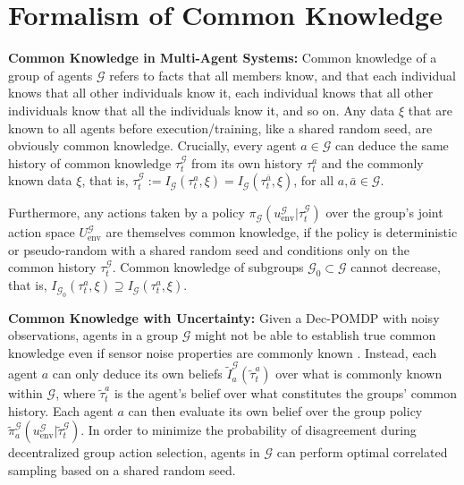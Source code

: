 \section{Formalism of Common Knowledge}
\label{sec:mackrl_details}
\textbf{Common Knowledge in Multi-Agent Systems: } Common knowledge of a group of agents ${\mathcal{G}}$ refers to facts that all members know, and that each individual knows that all other individuals know it, each individual knows that all other individuals know that all the individuals know it, and so on. Any data $\xi$ that are known to all agents before execution/training, like a shared random seed, are obviously common knowledge. Crucially, every agent $a \in {\mathcal{G}}$ can deduce the same history of common knowledge $\tau_t^{\mathcal{G}}$ from its own history $\tau_t^a$ and the commonly known data $\xi$, that is, $\tau_t^{\mathcal{G}} := I_{\mathcal{G}}(\tau_t^a, \xi) = I_{\mathcal{G}}(\tau_t^{\bar{a}}, \xi)$, for all $a, \bar{a} \in {\mathcal{G}}$.

Furthermore, any actions taken by a policy $\pi_{\mathcal{G}}(u_{\text{env}}^{\mathcal{G}} | \tau_t^{\mathcal{G}})$ over the group’s joint action space $U_{\text{env}}^{\mathcal{G}}$ are themselves common knowledge, if the policy is deterministic or pseudo-random with a shared random seed and conditions only on the common history $\tau_t^{\mathcal{G}}$. Common knowledge of subgroups ${\mathcal{G}}_0 \subset \mathcal{G}$ cannot decrease, that is, $I_{{\mathcal{G}}_0}(\tau_t^a, \xi) \supseteq I_{\mathcal{G}}(\tau_t^a, \xi)$.

\textbf{Common Knowledge with Uncertainty:} Given a Dec-POMDP with noisy observations, agents in a group $\mathcal{G}$ might not be able to establish true common knowledge even if sensor noise properties are commonly known \parencite{knowledge_common_knowledge_distributed_env}. Instead, each agent $a$ can only deduce its own beliefs $\tilde{I}_a^{\mathcal{G}}(\tilde{\tau}_t^a)$ over what is commonly known within $\mathcal{G}$, where $\tilde{\tau}_t^a$ is the agent’s belief over what constitutes the groups’ common history. Each agent $a$ can then evaluate its own belief over the group policy $\tilde{\pi}_a^{\mathcal{G}}(u_{\text{env}}^{\mathcal{G}} | \tilde{\tau}_t^{\mathcal{G}})$. In order to minimize the probability of disagreement during decentralized group action selection, agents in $\mathcal{G}$ can perform optimal correlated sampling based on a shared random seed.

